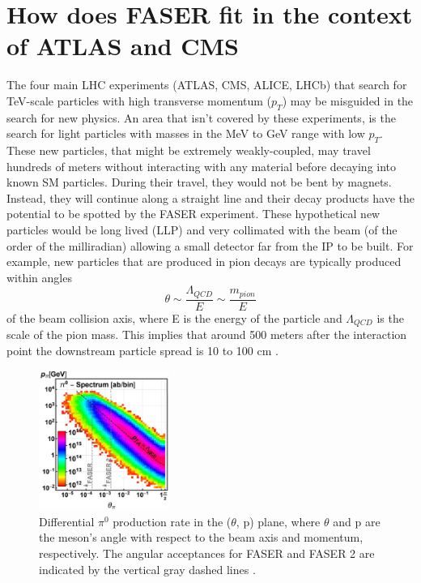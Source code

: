 \section{How does FASER fit in the context of ATLAS and CMS}

The four main LHC experiments (ATLAS, CMS, ALICE, LHCb) that search for TeV-scale particles with high transverse momentum ($p_{T}$) may be misguided in the search for new physics. An area that isn't covered by these experiments, is the search for light particles with masses in the MeV to GeV range with low $p_{T}$. These new particles, that might be extremely weakly-coupled, may travel hundreds of meters without interacting with any material before decaying into known SM particles. During their travel, they would not be bent by magnets. Instead, they will continue along a straight line and their decay products have the potential to be spotted by the FASER experiment. These hypothetical new particles would be long lived (LLP) and very collimated with the beam (of the order of the milliradian) allowing a small detector far from the IP to be built. For example, new particles that are produced in pion decays are typically produced within angles \[ \theta\sim\frac{\Lambda_{QCD}}{E}\sim\frac{m_{pion}}{E} \] of the beam collision axis, where E is the energy of the particle and $\Lambda_{QCD}$ is the scale of the pion mass. This implies that around 500 meters after the interaction point the downstream particle spread is 10 to 100 cm \cite{faser_collaboration_letter_2018}. 

\begin{figure}
  \centering
    \includegraphics[width=0.38\textwidth]{Introduction/Figs/Raster/momentumVSangle.jpg} 
    \caption[Momentum vs angle]{Differential $\pi^{0}$ production rate in the ($\theta$, p) plane, where $\theta$ and p are the meson’s angle with respect to the beam axis and momentum, respectively. The angular acceptances for FASER and FASER 2 are indicated by the vertical gray dashed lines \cite{faser_collaboration_fasers_2019}.}
    \label{fig:momentumVSangle}
\end{figure}

